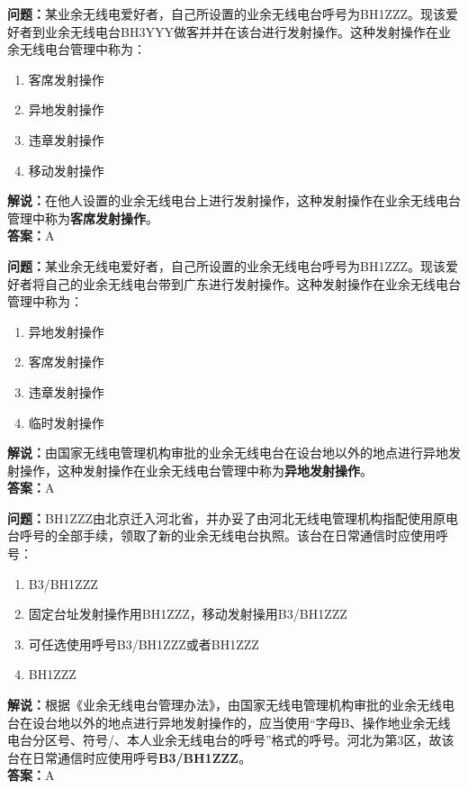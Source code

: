 \textbf{问题：}某业余无线电爱好者，自己所设置的业余无线电台呼号为BH1ZZZ。现该爱好者到业余无线电台BH3YYY做客并并在该台进行发射操作。这种发射操作在业余无线电台管理中称为：
\begin{enumerate}[label=\Alph*), leftmargin=1cm]
	\item 客席发射操作
	\item 异地发射操作
	\item 违章发射操作
	\item 移动发射操作
\end{enumerate}
\textbf{解说：}在他人设置的业余无线电台上进行发射操作，这种发射操作在业余无线电台管理中称为\textbf{客席发射操作}。\\\textbf{答案：}A%

\textbf{问题：}某业余无线电爱好者，自己所设置的业余无线电台呼号为BH1ZZZ。现该爱好者将自己的业余无线电台带到广东进行发射操作。这种发射操作在业余无线电台管理中称为：
\begin{enumerate}[label=\Alph*), leftmargin=1cm]
	\item 异地发射操作
	\item 客席发射操作
	\item 违章发射操作
	\item 临时发射操作
\end{enumerate}
\textbf{解说：}由国家无线电管理机构审批的业余无线电台在设台地以外的地点进行异地发射操作，这种发射操作在业余无线电台管理中称为\textbf{异地发射操作}。\\\textbf{答案：}A%

\textbf{问题：}BH1ZZZ由北京迁入河北省，并办妥了由河北无线电管理机构指配使用原电台呼号的全部手续，领取了新的业余无线电台执照。该台在日常通信时应使用呼号：
\begin{enumerate}[label=\Alph*), leftmargin=1cm]
	\item B3/BH1ZZZ
	\item 固定台址发射操作用BH1ZZZ，移动发射操用B3/BH1ZZZ
	\item 可任选使用呼号B3/BH1ZZZ或者BH1ZZZ
	\item BH1ZZZ
\end{enumerate}
\textbf{解说：}根据《业余无线电台管理办法》，由国家无线电管理机构审批的业余无线电台在设台地以外的地点进行异地发射操作的，应当使用“字母B、操作地业余无线电台分区号、符号/、本人业余无线电台的呼号”格式的呼号。河北为第3区，故该台在日常通信时应使用呼号\textbf{B3/BH1ZZZ}。\\\textbf{答案：}A

